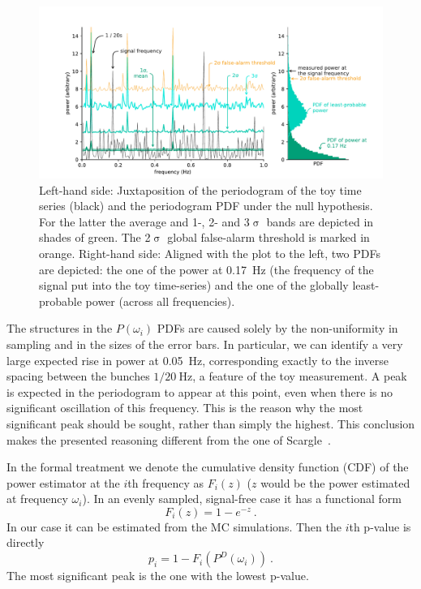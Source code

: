 \begin{figure}
  \centering \includegraphics[width=\linewidth]{gfx/axions/basic_detection.pdf}
  \caption{Left-hand side: Juxtaposition of the periodogram of the toy time series (black) and the periodogram PDF under the null hypothesis. For the latter the average and 1-, 2- and 3$\upsigma$ bands are depicted in shades of green. The 2$\upsigma$ global false-alarm threshold is marked in orange. Right-hand side: Aligned with the plot to the left, two PDFs are depicted: the one of the power at \SI{0.17}{\hertz} (the frequency of the signal put into the toy time-series) and the one of the globally least-probable power (across all frequencies).}\label{fig:basic_detection}
\end{figure}

The structures in the $P(\omega_i)$ PDFs are caused solely by the non-uniformity in sampling and in the sizes of the error bars. In particular, we can identify a very large expected rise in power at \SI{0.05}{\hertz}, corresponding exactly to the inverse spacing between the bunches $1 / \SI{20}{\hertz}$, a feature of the toy measurement. A peak is expected in the periodogram to appear at this point, even when there is no significant oscillation of this frequency. This is the reason why the most significant peak should be sought, rather than simply the highest. This conclusion makes the presented reasoning different from the one of Scargle~\cite{Scargle1982}.

In the formal treatment we denote the cumulative density function (CDF) of the power estimator at the $i$th frequency as $F_i(z)$ ($z$ would be the power estimated at frequency $\omega_i$). In an evenly sampled, signal-free case it has a functional form
\begin{equation}
  \label{eq:local_functional_form}
  F_i(z) = 1 - e^{-z} \ .
\end{equation}
In our case it can be estimated from the MC simulations. Then the $i$th p-value is directly
\begin{equation} \label{eq:local_p_value}
  p_i = 1 - F_i\left( P^D(\omega_i) \right) \ .
\end{equation}
The most significant peak is the one with the lowest p-value.

